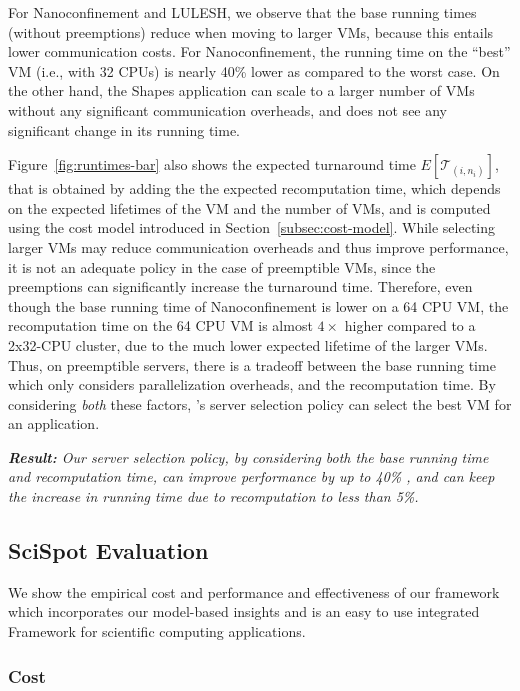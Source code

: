 For Nanoconfinement and LULESH, we observe that the base running times (without preemptions) reduce when moving to larger VMs, because this entails lower communication costs.
For Nanoconfinement, the running time on the ``best'' VM (i.e., with 32 CPUs) is nearly 40\% lower as compared to the worst case. 
On the other hand, the Shapes application can scale to a larger number of VMs without any significant communication overheads, and does not see any significant change in its running time. 

Figure~\ref{fig:runtimes-bar} also shows the expected turnaround time $E[\mathcal{T}_{(i,n_i)}]$, that is obtained by adding the the expected recomputation time, which depends on the expected lifetimes of the VM and the number of VMs, and is computed using the cost model introduced in Section~\ref{subsec:cost-model}. 
While selecting larger VMs may reduce communication overheads and thus improve performance, it is not an adequate policy in the case of preemptible VMs, since the preemptions can significantly increase the turnaround time.
Therefore, even though the base running time of Nanoconfinement is lower on a 64 CPU VM, the recomputation time on the 64 CPU VM is almost $4\times$ higher compared to a 2x32-CPU cluster,  due to the much lower expected lifetime of the larger VMs. 
Thus, on preemptible servers, there is a tradeoff between the base running time which only considers parallelization overheads, and the recomputation time.
By considering \emph{both} these factors, \sysname's server selection policy can select the best VM for an application. 


\noindent \emph{\textbf{Result:} Our server selection policy, by considering both the base running time and recomputation time, can improve performance by up to 40\% , and can keep the increase in running time due to recomputation to less than 5\%.}


\subsection{SciSpot Evaluation}

We show the empirical cost and performance and effectiveness of our \sysname framework which incorporates our model-based insights and is an easy to use integrated Framework for scientific computing applications. 


\subsubsection{Cost}

